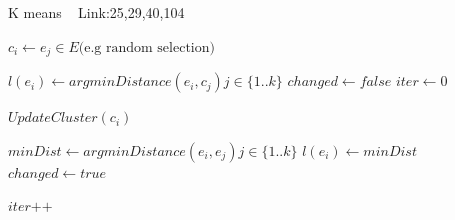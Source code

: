 \documentclass[a4paper]{article}
\begin{document}
\begin{algorithm}
 \caption{K means ~\cite{kmeans1} Link:25,29,40,104   }
    \begin{algorithmic}[1]
     
   
  \State $c_{i} \leftarrow e_{j} \in E \text{(e.g random selection)}$
   
    \EndFor
    
    \State $l(e_{i}) \leftarrow argminDistance(e_{i},c_{j})j \in \{1..k\} $
      \EndFor
      \State $changed \leftarrow false$
      \State $iter \leftarrow 0$
    
    
    \State $UpdateCluster(c_{i})$
    
     \EndFor
     
     \State $minDist \leftarrow argminDistance(e_{i},e_{j}) j \in \{1..k\}$
       \State $l(e_i) \leftarrow minDist$
       \State $changed \leftarrow true$
       
       \EndIf
     
    \EndFor
   \State $ iter \texttt{+} \texttt{+}$
      \EndWhile
   

 
 \end{algorithmic}
\end{algorithm}
\end{document}

